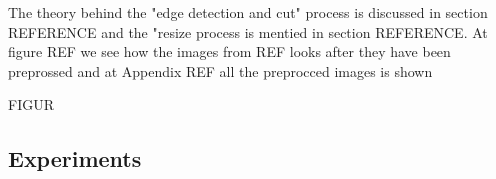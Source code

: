 \documentclass[11pt]{article}
\begin{document}
The theory behind the "edge detection and cut" process is discussed in section REFERENCE and the "resize process is mentied in section REFERENCE. At figure REF we see how the images from REF looks after they have been preprossed and at Appendix REF all the preprocced images is shown

FIGUR


\subsection{Experiments}
\end{document}
